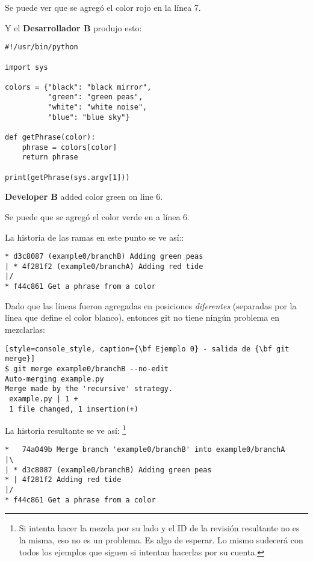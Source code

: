 Se puede ver que se agregó el color rojo en la línea 7.

Y el {\bf Desarrollador B} produjo esto:
\begin{lstlisting}[style=python_style, caption={\bf Ejemplo 0} - Desarrollador B]
#!/usr/bin/python

import sys

colors = {"black": "black mirror",
          "green": "green peas",
          "white": "white noise",
          "blue": "blue sky"}

def getPhrase(color):
    phrase = colors[color]
    return phrase

print(getPhrase(sys.argv[1]))
\end{lstlisting}
{\bf Developer B} added color green on line 6.

Se puede que se agregó el color verde en a línea 6.

La historia de las ramas en este punto se ve así::
\begin{lstlisting}[style=branch_history_style, caption={\bf Example 0} - branch history]
* d3c8087 (example0/branchB) Adding green peas
| * 4f281f2 (example0/branchA) Adding red tide
|/  
* f44c861 Get a phrase from a color
\end{lstlisting}

Dado que las líneas fueron agregadas en posiciones {\it diferentes} (separadas por la línea que define el color blanco), entonces
git no tiene ningún problema en mezclarlas:

\begin{lstlisting}[style=console_style, caption={\bf Ejemplo 0} - salida de {\bf git merge}]
$ git merge example0/branchB --no-edit
Auto-merging example.py
Merge made by the 'recursive' strategy.
 example.py | 1 +
 1 file changed, 1 insertion(+)
\end{lstlisting}

La historia resultante se ve así: \footnote{Si intenta hacer la mezcla por su lado y el ID de la revisión resultante no es la misma,
eso no es un problema. Es algo de esperar. Lo mismo sudecerá con todos los ejemplos que siguen si intentan hacerlas por su cuenta.}

\begin{lstlisting}[style=branch_history_style, caption={\bf Ejemplo 0} - historia final de las ramas]
*   74a049b Merge branch 'example0/branchB' into example0/branchA
|\  
| * d3c8087 (example0/branchB) Adding green peas
* | 4f281f2 Adding red tide
|/  
* f44c861 Get a phrase from a color
\end{lstlisting}

